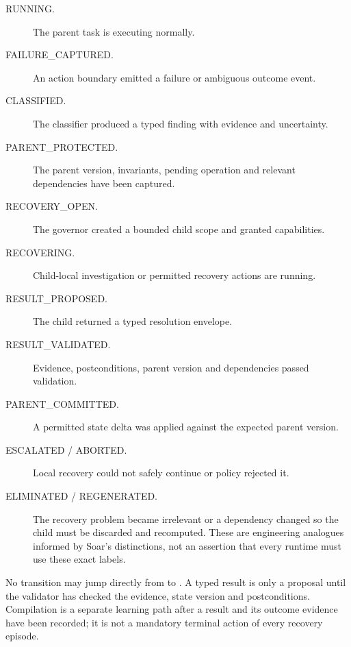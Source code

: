 \begin{description}
  \item[RUNNING.] The parent task is executing normally.
  \item[FAILURE\_CAPTURED.] An action boundary emitted a failure or ambiguous outcome event.
  \item[CLASSIFIED.] The classifier produced a typed finding with evidence and uncertainty.
  \item[PARENT\_PROTECTED.] The parent version, invariants, pending operation and relevant dependencies have been captured.
  \item[RECOVERY\_OPEN.] The governor created a bounded child scope and granted capabilities.
  \item[RECOVERING.] Child-local investigation or permitted recovery actions are running.
  \item[RESULT\_PROPOSED.] The child returned a typed resolution envelope.
  \item[RESULT\_VALIDATED.] Evidence, postconditions, parent version and dependencies passed validation.
  \item[PARENT\_COMMITTED.] A permitted state delta was applied against the expected parent version.
  \item[ESCALATED / ABORTED.] Local recovery could not safely continue or policy rejected it.
  \item[ELIMINATED / REGENERATED.] The recovery problem became irrelevant or a dependency changed so the child must be discarded and recomputed. These are engineering analogues informed by Soar's distinctions, not an assertion that every runtime must use these exact labels.
\end{description}

No transition may jump directly from  to . A typed result is only a proposal until the validator has checked the evidence, state version and postconditions. Compilation is a separate learning path after a result and its outcome evidence have been recorded; it is not a mandatory terminal action of every recovery episode.

